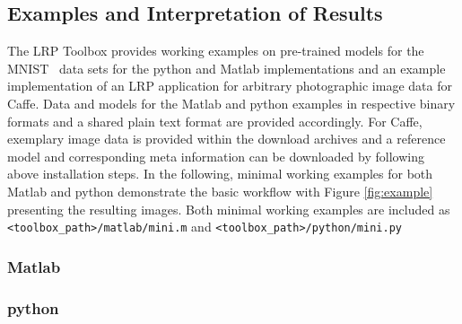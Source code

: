 \documentclass[a4wide]{article}
\begin{document}
\subsection*{Examples and Interpretation of Results}
The LRP Toolbox provides working examples on pre-trained models for the MNIST~\cite{lecun1998mnist} data sets for the python and Matlab implementations and an example implementation of an LRP application for arbitrary photographic image data for Caffe. Data and models for the Matlab and python examples in respective binary formats and a shared plain text format are provided accordingly. For Caffe, exemplary image data is provided within the download archives and a  reference model and corresponding meta information can be downloaded by following above installation steps.
In the following, minimal working examples for both Matlab and python demonstrate the basic workflow with Figure \ref{fig:example} presenting the resulting images. Both minimal working examples are included as \texttt{<toolbox\_path>/matlab/mini.m} and \texttt{<toolbox\_path>/python/mini.py} \\
\begin{minipage}[t]{.5\textwidth}
\subsubsection*{\vphantom{python} Matlab}

\end{minipage}
\begin{minipage}[t]{.5\textwidth}
\subsubsection*{python \vphantom{Matlab}}

\end{minipage}
\end{document}
